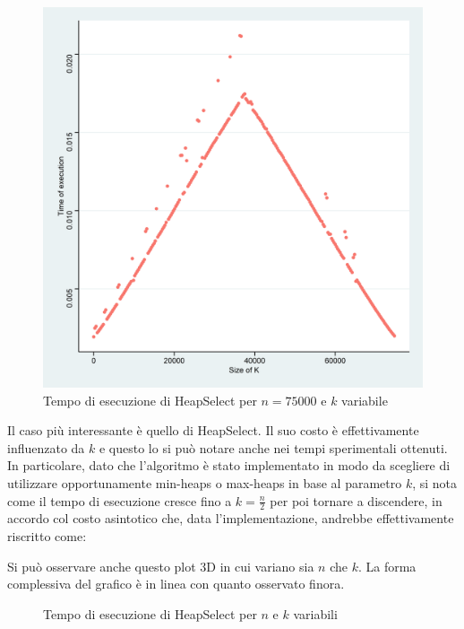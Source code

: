 \documentclass{article}
\begin{document}
	\begin{figure}[h!]
  		\includegraphics[width=\linewidth]{images/HeapSelect_Kvariable.png}
  		\caption{Tempo di esecuzione di HeapSelect per $n=75000$ e $k$ variabile}
  		\label{fig:graph4}
	\end{figure}
	
Il caso più interessante è quello di HeapSelect. Il suo costo è effettivamente influenzato da $k$ e questo lo si può notare anche nei tempi sperimentali ottenuti. In particolare, dato che l'algoritmo è stato implementato in modo da scegliere di utilizzare opportunamente min-heaps o max-heaps in base al parametro $k$, si nota come il tempo di esecuzione cresce fino a $k=\frac{n}{2}$ per poi tornare a discendere, in accordo col costo asintotico che, data l'implementazione, andrebbe effettivamente riscritto come:
	
	
	\newpage
	Si può osservare anche questo plot 3D in cui variano sia $n$ che $k$. La forma complessiva del grafico è in linea con quanto osservato finora.
	
	\begin{figure}[h!]
		\centering
  		\caption{Tempo di esecuzione di HeapSelect per $n$ e $k$ variabili}
  		\label{fig:graph5}
	\end{figure}
		
\end{document}
